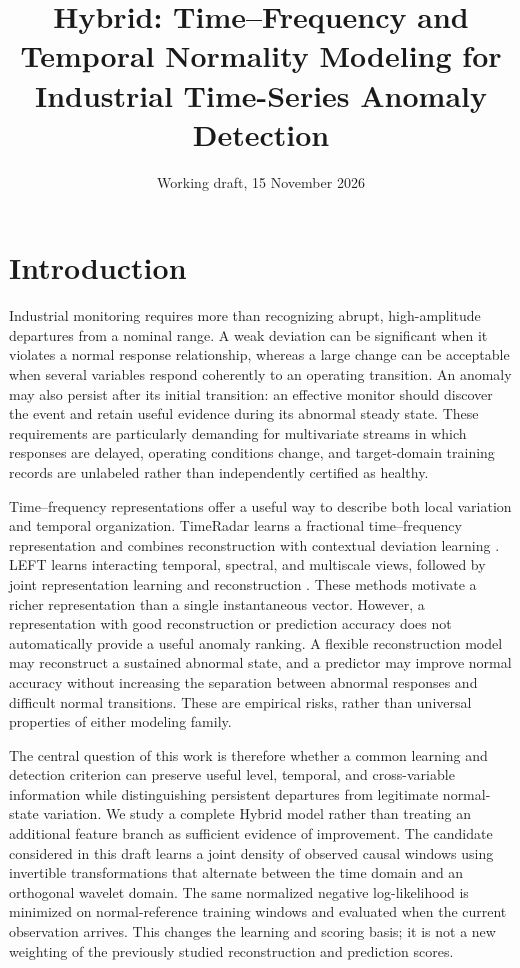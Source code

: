 \documentclass[
  english,
]{article}
\title{Hybrid: Time--Frequency and Temporal Normality Modeling for
Industrial Time-Series Anomaly Detection}
\author{}
\date{Working draft, 15 November 2026}
\begin{document}
\maketitle

\section{Introduction}\label{introduction}

Industrial monitoring requires more than recognizing abrupt,
high-amplitude departures from a nominal range. A weak deviation can be
significant when it violates a normal response relationship, whereas a
large change can be acceptable when several variables respond coherently
to an operating transition. An anomaly may also persist after its
initial transition: an effective monitor should discover the event and
retain useful evidence during its abnormal steady state. These
requirements are particularly demanding for multivariate streams in
which responses are delayed, operating conditions change, and
target-domain training records are unlabeled rather than independently
certified as healthy.

Time--frequency representations offer a useful way to describe both
local variation and temporal organization. TimeRadar learns a fractional
time--frequency representation and combines reconstruction with
contextual deviation learning \citep{timeradar2026}. LEFT learns
interacting temporal, spectral, and multiscale views, followed by joint
representation learning and reconstruction \citep{left2026}. These
methods motivate a richer representation than a single instantaneous
vector. However, a representation with good reconstruction or prediction
accuracy does not automatically provide a useful anomaly ranking. A
flexible reconstruction model may reconstruct a sustained abnormal
state, and a predictor may improve normal accuracy without increasing
the separation between abnormal responses and difficult normal
transitions. These are empirical risks, rather than universal properties
of either modeling family.

The central question of this work is therefore whether a common learning
and detection criterion can preserve useful level, temporal, and
cross-variable information while distinguishing persistent departures
from legitimate normal-state variation. We study a complete Hybrid model
rather than treating an additional feature branch as sufficient evidence
of improvement. The candidate considered in this draft learns a joint
density of observed causal windows using invertible transformations that
alternate between the time domain and an orthogonal wavelet domain. The
same normalized negative log-likelihood is minimized on normal-reference
training windows and evaluated when the current observation arrives.
This changes the learning and scoring basis; it is not a new weighting
of the previously studied reconstruction and prediction scores.
\end{document}
